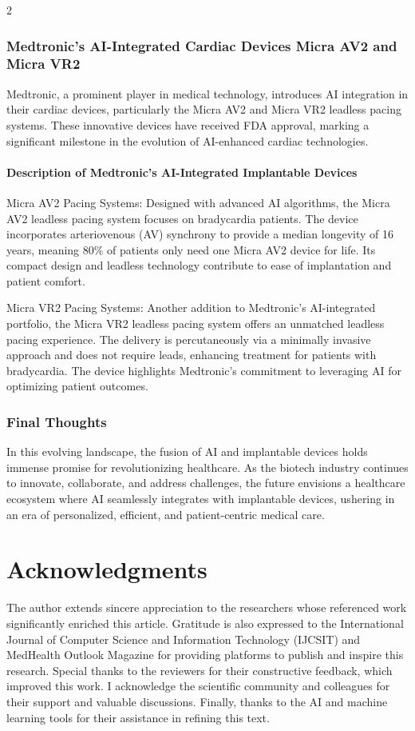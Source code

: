 \documentclass[12pt,oneside]{academia}
\theoremstyle{remark}
\begin{document}
\begin{multicols}{2}
\subsubsection{Medtronic's AI-Integrated Cardiac Devices Micra AV2 and Micra VR2}
Medtronic, a prominent player in medical technology, introduces AI integration in their cardiac devices, particularly the Micra AV2 and Micra VR2 leadless pacing systems. These innovative devices have received FDA approval, marking a significant milestone in the evolution of AI-enhanced cardiac technologies.

\paragraph{Description of Medtronic's AI-Integrated Implantable Devices}
Micra AV2 Pacing Systems: Designed with advanced AI algorithms, the Micra AV2 leadless pacing system focuses on bradycardia patients. The device incorporates arteriovenous (AV) synchrony to provide a median longevity of 16 years, meaning 80\% of patients only need one Micra AV2 device for life. Its compact design and leadless technology contribute to ease of implantation and patient comfort.

Micra VR2 Pacing Systems: Another addition to Medtronic's AI-integrated portfolio, the Micra VR2 leadless pacing system offers an unmatched leadless pacing experience. The delivery is percutaneously via a minimally invasive approach and does not require leads, enhancing treatment for patients with bradycardia. The device highlights Medtronic's commitment to leveraging AI for optimizing patient outcomes.

\subsubsection{Final Thoughts}
In this evolving landscape, the fusion of AI and implantable devices holds immense promise for revolutionizing healthcare. As the biotech industry continues to innovate, collaborate, and address challenges, the future envisions a healthcare ecosystem where AI seamlessly integrates with implantable devices, ushering in an era of personalized, efficient, and patient-centric medical care.

\section{Acknowledgments}
The author extends sincere appreciation to the researchers whose referenced work significantly enriched this article. Gratitude is also expressed to the International Journal of Computer Science and Information Technology (IJCSIT) and MedHealth Outlook Magazine for providing platforms to publish and inspire this research. Special thanks to the reviewers for their constructive feedback, which improved this work. I acknowledge the scientific community and colleagues for their support and valuable discussions. Finally, thanks to the AI and machine learning tools for their assistance in refining this text.


\end{multicols}
\end{document}
